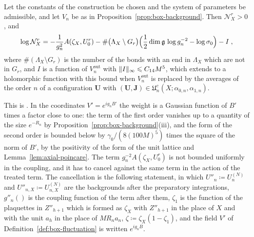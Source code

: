 \documentclass[11pt]{preprint}
\makeatletter
\DeclarePairedDelimiter{\norm}{\lVert}{\rVert}
\newcommand*{\bigcdot}{}%
\DeclareRobustCommand*{\bigcdot}{%
	\mathbin{\mathpalette\bigcdot@{}}%
}
\newcommand*{\bigcdot@scalefactor}{.7}
\newcommand*{\bigcdot@widthfactor}{1.15}
\newcommand*{\bigcdot@}[2]{%
	\sbox0{$#1\vcenter{}$}%
	\sbox2{$#1\cdot\m@th$}%
	\hbox to \bigcdot@widthfactor\wd2{%
		\hss
		\raise\ht0\hbox{%
			\scalebox{\bigcdot@scalefactor}{%
				\lower\ht0\hbox{$#1\bullet\m@th$}%
			}%
		}%
		\hss
	}%
}
\numberwithin{equation}{section}
\makeatother
\begin{document}
\begin{proposition}\label{prop:box-denominator}
Let the constants of the construction be chosen and the system of parameters be admissible, and let $V_n$ be as in Proposition~\ref{prop:box-background}. Then $\mathcal N^r_X > 0$, and
\begin{equation}\label{eq:box-denominator}
    \log\mathcal N^r_X = -\frac{1}{g_n^2}A(\zeta_X, U^r_0) - \#\bigl(\Lambda_X \setminus G_r\bigr)\Bigl(\frac{1}{2}\dim\mathfrak g\,\log g_n^{-2} - \log\sigma_0\Bigr) - I\;,
\end{equation}
where $\#(\Lambda_X \setminus G_r)$ is the number of the bonds with an end in $\Lambda_X$ which are not in $G_r$, and $I$ is a function of $V^{\mathrm{out}}_n$ with $\norm I_\infty \leqslant C_{14}M^5$, which extends to a holomorphic function with this bound when $V^{\mathrm{out}}_n$ is replaced by the averages of the order $n$ of a configuration $\mathbf U$ with $(\mathbf U, \mathbf J) \in \mathfrak U^c_n(X; \alpha_{0,n}, \alpha_{1,n})$.
\end{proposition}

This is \cite[(1.2)--(1.11), pp.~356--358]{BalabanLFR2}. In the coordinates $V' = e^{ig_nB'}$ the weight is a Gaussian function of $B'$ times a factor close to one: the term of the first order vanishes up to a quantity of the size $e^{-R_n}$ by Proposition~\ref{prop:box-background}(iii), and the form of the second order is bounded below by $\gamma_0/(8(100M)^5)$ times the square of the norm of $B'$, by the positivity of the form of the unit lattice and Lemma~\ref{lem:axial-poincare}. The term $g_n^{-2}A(\zeta_X, U^r_0)$ is not bounded uniformly in the coupling, and it has to cancel against the same term in the action of the treated term. The cancellation is the following statement, in which $U''_n \coloneqq U^{(N)}_n$ and $U''_{n,X} \coloneqq U^{(N)}_{n,X}$ are the backgrounds after the preparatory integrations, $g''_n(\bigcdot)$ is the coupling function of the term after them, $\zeta_1$ is the function of the plaquettes in $Z''_{h+1}$ which is formed as $\zeta_X$ with $Z''_{h+1}$ in the place of $X$ and with the unit $a_h$ in the place of $MR_na_n$, $\zeta \coloneqq \zeta_X(1 - \zeta_1)$, and the field $V'$ of Definition~\ref{def:box-fluctuation} is written $e^{ig_nB}$.
\end{document}
